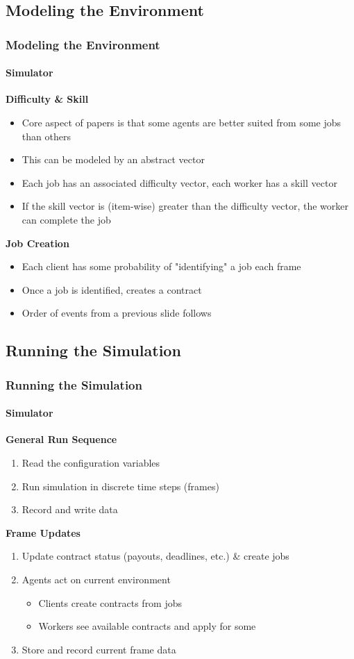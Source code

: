 \documentclass[
	10pt, %
	aspectratio=169, %
]{beamer}
\begin{document}
\subsection{Modeling the Environment}
\begin{frame}
	\frametitle{Modeling the Environment}
	\framesubtitle{Simulator}

	{
		\large \bf
		Difficulty \& Skill
	}
	\begin{itemize}
		\item Core aspect of papers is that some agents are better suited from some jobs than others
		\item This can be modeled by an abstract vector
		\item Each job has an associated difficulty vector, each worker has a skill vector
		\item If the skill vector is (item-wise) greater than the difficulty vector, the worker can complete the job
	\end{itemize}

	\medskip

	{
		\large \bf
		Job Creation
	}
	\begin{itemize}
		\item Each client has some probability of "identifying" a job each frame
		\item Once a job is identified, creates a contract
		\item Order of events from a previous slide follows
	\end{itemize}
	
\end{frame}

\subsection{Running the Simulation}
\begin{frame}
	\frametitle{Running the Simulation}
	\framesubtitle{Simulator}

	{
		\large \bf
		General Run Sequence
	}
	\begin{enumerate}
		\item Read the configuration variables
		\item Run simulation in discrete time steps (frames)
		\item Record and write data
	\end{enumerate}

	\medskip

	{
		\large \bf
		Frame Updates
	}
	\begin{enumerate}
		\item Update contract status (payouts, deadlines, etc.) \& create jobs
		\item Agents act on current environment
		\begin{itemize}
			\item Clients create contracts from jobs
			\item Workers see available contracts and apply for some
		\end{itemize}
		\item Store and record current frame data
	\end{enumerate}
\end{frame}
\end{document}
